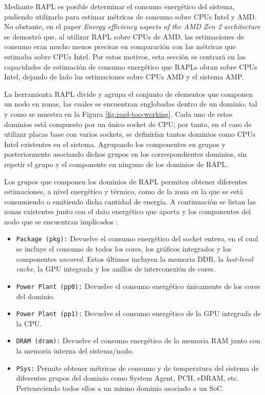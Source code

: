  Mediante RAPL es posible determinar el consumo energético del sistema, pudiendo utilizarlo para estimar métricas de consumo sobre CPUs Intel y AMD. No obstante, en el paper \textit{Energy efficiency aspects of the AMD Zen 2 architecture} \cite{rapel-due-amd} se demostró que, al utilizar RAPL sobre CPUs de AMD, las estimaciones de consumo eran mucho menos precisas en comparación con las métricas que estimaba sobre CPUs Intel. Por estos motivos, esta sección se centrará en las capacidades de estimación de consumo energético que RAPLs obran sobre CPUs Intel, dejando de lado las estimaciones sobre CPUs AMD y el sistema AMP.

 La herramienta RAPL divide y agrupa el conjunto de elementos que componen un nodo en zonas, las cuales se encuentran englobadas dentro de un dominio, tal y como se muestra en la Figura \ref{fig:rapl-too-working}. Cada uno de estos dominios está compuesto por un único socket de CPU; por tanto, en el caso de utilizar placas base con varios sockets, se definirían tantos dominios como CPUs Intel existentes en el sistema. Agrupando los componentes en grupos y posteriormente asociando dichos grupos en los correspondientes dominios, sin repetir el grupo y el componente en ninguno de los dominios de RAPL.

 Los grupos que componen los dominios de RAPL permiten obtener diferentes estimaciones, a nivel energético y térmico, como de la zona en la que se está consumiendo o emitiendo dicha cantidad de energía. A continuación se listan las zonas existentes junto con el dato energético que aporta y los componentes del nodo que se encuentran implicados \cite{rapl-tool}:  

 \begin{itemize} 
   \item \texttt{Package (pkg):} Devuelve el consumo energético del socket entero, en el cual se incluye el consumo de todos los cores, los gráficos integrados y los componentes \textit{uncored}. Estos últimos incluyen la memoria DDR, la \textit{last-level cache}, la GPU integrada y los anillos de interconexión de cores.
 
   \item \texttt{Power Plant (pp0):} Devuelve el consumo energético únicamente de los cores del dominio.
 
   \item \texttt{Power Plant (pp1):} Devuelve el consumo energético de la GPU integrada de la CPU.
 
   \item \texttt{DRAM (dram):} Devuelve el consumo energético de la memoria RAM junto con la memoria interna del sistema/nodo.
 
   \item \texttt{PSys:} Permite obtener métricas de consumo y de temperatura del sistema de diferentes grupos del dominio como System Agent, PCH, eDRAM, etc. Perteneciendo todos ellos a un mismo dominio asociado a un SoC.
 \end{itemize}

